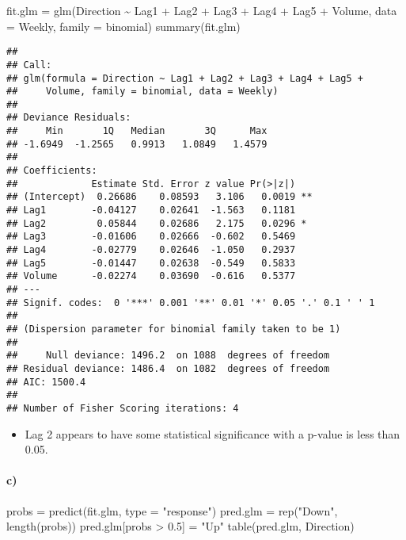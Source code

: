\documentclass[
]{article}
\newenvironment{Shaded}{\begin{snugshade}}{\end{snugshade}}
\newcommand{\AttributeTok}[1]{\textcolor[rgb]{0.77,0.63,0.00}{#1}}
\newcommand{\FloatTok}[1]{\textcolor[rgb]{0.00,0.00,0.81}{#1}}
\newcommand{\FunctionTok}[1]{\textcolor[rgb]{0.00,0.00,0.00}{#1}}
\newcommand{\NormalTok}[1]{#1}
\newcommand{\OtherTok}[1]{\textcolor[rgb]{0.56,0.35,0.01}{#1}}
\newcommand{\SpecialCharTok}[1]{\textcolor[rgb]{0.00,0.00,0.00}{#1}}
\newcommand{\StringTok}[1]{\textcolor[rgb]{0.31,0.60,0.02}{#1}}
\providecommand{\tightlist}{%
  \setlength{\itemsep}{0pt}\setlength{\parskip}{0pt}}
\begin{document}
\begin{Shaded}
\begin{Highlighting}[]
\NormalTok{fit.glm }\OtherTok{=} \FunctionTok{glm}\NormalTok{(Direction }\SpecialCharTok{\textasciitilde{}}\NormalTok{ Lag1 }\SpecialCharTok{+}\NormalTok{ Lag2 }\SpecialCharTok{+}\NormalTok{ Lag3 }\SpecialCharTok{+}\NormalTok{ Lag4 }\SpecialCharTok{+}\NormalTok{ Lag5 }\SpecialCharTok{+}\NormalTok{ Volume, }\AttributeTok{data =}\NormalTok{ Weekly, }\AttributeTok{family =}\NormalTok{ binomial)}
\FunctionTok{summary}\NormalTok{(fit.glm)}
\end{Highlighting}
\end{Shaded}

\begin{verbatim}
## 
## Call:
## glm(formula = Direction ~ Lag1 + Lag2 + Lag3 + Lag4 + Lag5 + 
##     Volume, family = binomial, data = Weekly)
## 
## Deviance Residuals: 
##     Min       1Q   Median       3Q      Max  
## -1.6949  -1.2565   0.9913   1.0849   1.4579  
## 
## Coefficients:
##             Estimate Std. Error z value Pr(>|z|)   
## (Intercept)  0.26686    0.08593   3.106   0.0019 **
## Lag1        -0.04127    0.02641  -1.563   0.1181   
## Lag2         0.05844    0.02686   2.175   0.0296 * 
## Lag3        -0.01606    0.02666  -0.602   0.5469   
## Lag4        -0.02779    0.02646  -1.050   0.2937   
## Lag5        -0.01447    0.02638  -0.549   0.5833   
## Volume      -0.02274    0.03690  -0.616   0.5377   
## ---
## Signif. codes:  0 '***' 0.001 '**' 0.01 '*' 0.05 '.' 0.1 ' ' 1
## 
## (Dispersion parameter for binomial family taken to be 1)
## 
##     Null deviance: 1496.2  on 1088  degrees of freedom
## Residual deviance: 1486.4  on 1082  degrees of freedom
## AIC: 1500.4
## 
## Number of Fisher Scoring iterations: 4
\end{verbatim}

\begin{itemize}
\tightlist
\item
  Lag 2 appears to have some statistical significance with a p-value is
  less than 0.05.
\end{itemize}

\hypertarget{c}{%
\paragraph{c)}\label{c}}

\begin{Shaded}
\begin{Highlighting}[]
\NormalTok{probs }\OtherTok{=} \FunctionTok{predict}\NormalTok{(fit.glm, }\AttributeTok{type =} \StringTok{"response"}\NormalTok{)}
\NormalTok{pred.glm }\OtherTok{=} \FunctionTok{rep}\NormalTok{(}\StringTok{"Down"}\NormalTok{, }\FunctionTok{length}\NormalTok{(probs))}
\NormalTok{pred.glm[probs }\SpecialCharTok{\textgreater{}} \FloatTok{0.5}\NormalTok{] }\OtherTok{=} \StringTok{"Up"}
\FunctionTok{table}\NormalTok{(pred.glm, Direction)}
\end{Highlighting}
\end{Shaded}
\end{document}
